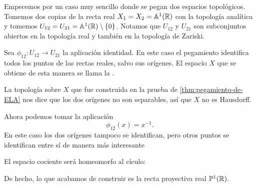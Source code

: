 \documentclass{article}
\numberwithin{equation}{section}
\theoremstyle{definition}
\begin{document}
\begin{ejemplo}
  Empecemos por un caso muy sencillo donde se pegan dos espacios
  topológicos. Tomemos dos copias de la recta real $X_1 = X_2 = \mathbb{A}^1 (\mathbb{R})$ con
  la topología analítica y tomemos
  $U_{12} = U_{21} = \mathbb{A}^1 (\mathbb{R}) \setminus \{ 0 \}$. Notamos que $U_{12}$ y
  $U_{21}$ son subconjuntos abiertos en la topología real y también en
  la topología de Zariski.

  Sea $\phi_{12}\colon U_{12} \to U_{21}$ la aplicación identidad. En este caso
  el pegamiento identifica todos los puntos de las rectas reales, salvo sus
  orígenes. El espacio $X$ que se obtiene de esta manera se llama la
  .

  \begin{center}
  \end{center}

  La topología sobre $X$ que fue construida en la prueba de
  \ref{thm:pegamiento-de-ELA} nos dice que los dos orígenes no son separables,
  así que $X$ no es Hausdorff.

  \vspace{1em}

  Ahora podemos tomar la aplicación
  $$\phi_{12} (x) = x^{-1}.$$
  En este caso los dos orígenes tampoco se identifican, pero otros puntos
  se identifican entre sí de manera más interesante
  \begin{center}
  \end{center}
  El espacio cociente será homeomorfo al cículo:
  \begin{center}
  \end{center}
  De hecho, lo que acabamos de construir es la recta proyectiva real
  $\mathbb{P}^1 (\mathbb{R})$.
\end{ejemplo}
\end{document}
